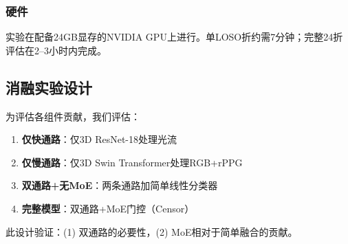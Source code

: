 \subsubsection{硬件}

实验在配备24GB显存的NVIDIA GPU上进行。单LOSO折约需7分钟；完整24折评估在2--3小时内完成。

\subsection{消融实验设计}

为评估各组件贡献，我们评估：
\begin{enumerate}
\item \textbf{仅快通路}：仅3D ResNet-18处理光流
\item \textbf{仅慢通路}：仅3D Swin Transformer处理RGB+rPPG
\item \textbf{双通路+无MoE}：两条通路加简单线性分类器
\item \textbf{完整模型}：双通路+MoE门控（Censor）
\end{enumerate}

此设计验证：(1) 双通路的必要性，(2) MoE相对于简单融合的贡献。